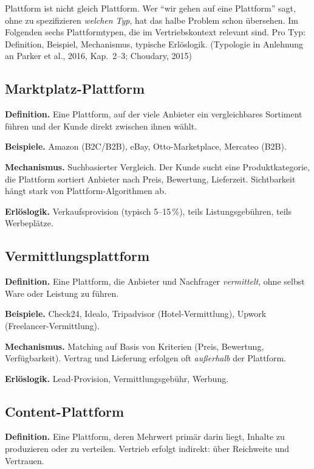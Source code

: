 \documentclass[11pt,a4paper,oneside]{article}
\newcommand{\quelle}[1]{{\footnotesize\color{lpGray}(#1)}}
\begin{document}
Plattform ist nicht gleich Plattform. Wer ``wir gehen auf eine Plattform'' sagt, ohne zu spezifizieren \emph{welchen Typ}, hat das halbe Problem schon übersehen. Im Folgenden sechs Plattformtypen, die im Vertriebskontext relevant sind. Pro Typ: Definition, Beispiel, Mechanismus, typische Erlöslogik. \quelle{Typologie in Anlehnung an Parker et al., 2016, Kap.~2--3; Choudary, 2015}

\subsection{Marktplatz-Plattform}

\textbf{Definition.} Eine Plattform, auf der viele Anbieter ein vergleichbares Sortiment führen und der Kunde direkt zwischen ihnen wählt.

\textbf{Beispiele.} Amazon (B2C/B2B), eBay, Otto-Marketplace, Mercateo (B2B).

\textbf{Mechanismus.} Suchbasierter Vergleich. Der Kunde sucht eine Produktkategorie, die Plattform sortiert Anbieter nach Preis, Bewertung, Lieferzeit. Sichtbarkeit hängt stark von Plattform-Algorithmen ab.

\textbf{Erlöslogik.} Verkaufsprovision (typisch 5--15\,\%), teils Listungsgebühren, teils Werbeplätze.

\subsection{Vermittlungsplattform}

\textbf{Definition.} Eine Plattform, die Anbieter und Nachfrager \emph{vermittelt}, ohne selbst Ware oder Leistung zu führen.

\textbf{Beispiele.} Check24, Idealo, Tripadvisor (Hotel-Vermittlung), Upwork (Freelancer-Vermittlung).

\textbf{Mechanismus.} Matching auf Basis von Kriterien (Preis, Bewertung, Verfügbarkeit). Vertrag und Lieferung erfolgen oft \emph{außerhalb} der Plattform.

\textbf{Erlöslogik.} Lead-Provision, Vermittlungsgebühr, Werbung.

\subsection{Content-Plattform}

\textbf{Definition.} Eine Plattform, deren Mehrwert primär darin liegt, Inhalte zu produzieren oder zu verteilen. Vertrieb erfolgt indirekt: über Reichweite und Vertrauen.
\end{document}
